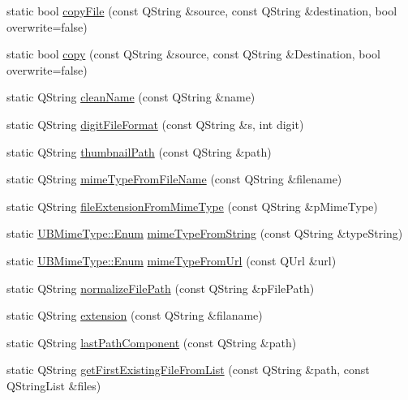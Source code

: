 \begin{DoxyCompactItemize}
\item 
static bool \hyperlink{class_u_b_file_system_utils_a21fb5e77a59d910b4aa94a0e71f04578}{copy\-File} (const Q\-String \&source, const Q\-String \&destination, bool overwrite=false)
\item 
static bool \hyperlink{class_u_b_file_system_utils_a6fbd2eaf3729eead6e9a8a85e230af96}{copy} (const Q\-String \&source, const Q\-String \&Destination, bool overwrite=false)
\item 
static Q\-String \hyperlink{class_u_b_file_system_utils_a19522888b07624d5f7e562be99dd8a80}{clean\-Name} (const Q\-String \&name)
\item 
static Q\-String \hyperlink{class_u_b_file_system_utils_a9ac90c91a836a34b5ccec620d8e4273a}{digit\-File\-Format} (const Q\-String \&s, int digit)
\item 
static Q\-String \hyperlink{class_u_b_file_system_utils_aad4d371b5e6400a42c44bec5f26ec5fd}{thumbnail\-Path} (const Q\-String \&path)
\item 
static Q\-String \hyperlink{class_u_b_file_system_utils_a272b08b8f8907091333982fb53a7aa2a}{mime\-Type\-From\-File\-Name} (const Q\-String \&filename)
\item 
static Q\-String \hyperlink{class_u_b_file_system_utils_a91f25baf989fa9da017a954239b4c0a2}{file\-Extension\-From\-Mime\-Type} (const Q\-String \&p\-Mime\-Type)
\item 
static \hyperlink{struct_u_b_mime_type_af592aa3f37be1b755c0d5dfd7dd76acb}{U\-B\-Mime\-Type\-::\-Enum} \hyperlink{class_u_b_file_system_utils_a793ff3d89661ee4663b8a2f055b87b60}{mime\-Type\-From\-String} (const Q\-String \&type\-String)
\item 
static \hyperlink{struct_u_b_mime_type_af592aa3f37be1b755c0d5dfd7dd76acb}{U\-B\-Mime\-Type\-::\-Enum} \hyperlink{class_u_b_file_system_utils_a9267f8eb18511dbb78f57726576d1fcc}{mime\-Type\-From\-Url} (const Q\-Url \&url)
\item 
static Q\-String \hyperlink{class_u_b_file_system_utils_af850f64fdd630fc78510c856f00ffa4f}{normalize\-File\-Path} (const Q\-String \&p\-File\-Path)
\item 
static Q\-String \hyperlink{class_u_b_file_system_utils_a8dcbcd889a2c79495470ff11f955c0b6}{extension} (const Q\-String \&filaname)
\item 
static Q\-String \hyperlink{class_u_b_file_system_utils_a058e2a16e0ff622693dc39732aa9f10b}{last\-Path\-Component} (const Q\-String \&path)
\item 
static Q\-String \hyperlink{class_u_b_file_system_utils_aeb559ce0c1f2d4b139560e170f657faa}{get\-First\-Existing\-File\-From\-List} (const Q\-String \&path, const Q\-String\-List \&files)

\end{DoxyCompactItemize}
